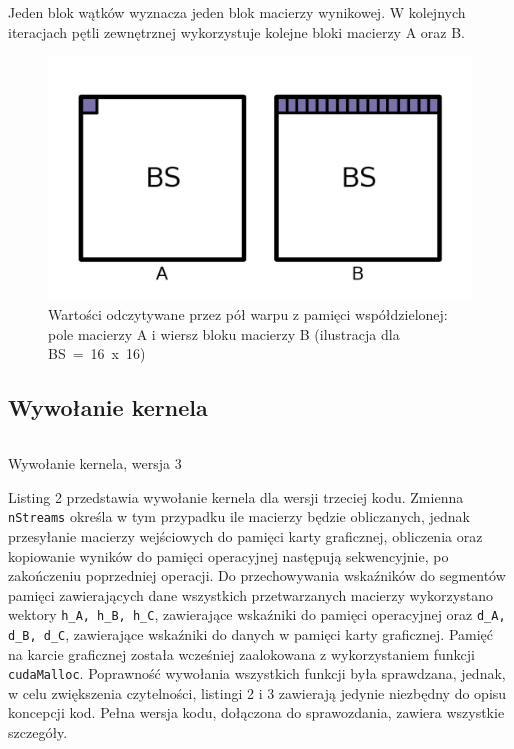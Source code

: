 \documentclass[12pt,a4paper]{article}
\begin{document}
Jeden blok wątków wyznacza jeden blok macierzy wynikowej. W kolejnych iteracjach pętli zewnętrznej wykorzystuje kolejne bloki macierzy A oraz B.

\begin{figure}[H]
  \centering
  \includegraphics[width=0.66\linewidth, trim={0 50px 0 0px}, clip=true]{images/3.jpg}
  \caption{Wartości odczytywane przez pół warpu z pamięci współdzielonej: pole macierzy A i wiersz bloku macierzy B (ilustracja dla BS~=~16~x~16)}
  \label{fig:matrix2}
\end{figure}


\subsection{Wywołanie kernela}

\begin{listing}[H]
\inputminted{cuda}{listings/invocation_sync.cu}
\caption{Wywołanie kernela, wersja 3}
\label{lst:sync}
\end{listing}

Listing 2 przedstawia wywołanie kernela dla wersji trzeciej kodu. Zmienna \verb|nStreams| określa w tym przypadku ile macierzy będzie obliczanych, jednak przesyłanie macierzy wejściowych do pamięci karty graficznej, obliczenia oraz kopiowanie wyników do pamięci operacyjnej następują sekwencyjnie, po zakończeniu poprzedniej operacji. Do przechowywania wskaźników do segmentów pamięci zawierających dane wszystkich przetwarzanych macierzy wykorzystano wektory \verb|h_A, h_B, h_C|, zawierające wskaźniki do pamięci operacyjnej oraz \verb|d_A, d_B, d_C|, zawierające wskaźniki do danych w pamięci karty graficznej. Pamięć na karcie graficznej została wcześniej zaalokowana z wykorzystaniem funkcji \verb|cudaMalloc|. Poprawność wywołania wszystkich funkcji była sprawdzana, jednak, w celu zwiększenia czytelności, listingi 2 i 3 zawierają jedynie niezbędny do opisu koncepcji kod. Pełna wersja kodu, dołączona do sprawozdania, zawiera wszystkie szczegóły.
\end{document}

